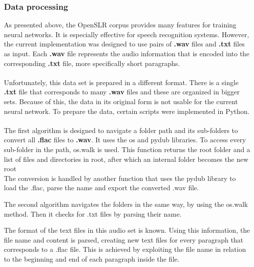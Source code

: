 \subsubsection{Data processing}
As presented above, the OpenSLR corpus provides many features for training neural networks. It is especially effective for speech recognition systems. However, the current implementation was designed to use pairs of \textbf{.wav} files and \textbf{.txt} files as input. Each \textbf{.wav} file represents the audio information that is encoded into the corresponding \textbf{.txt} file, more specifically short paragraphs.\\\\

Unfortunately, this data set is prepared in a different format. There is a single \textbf{.txt} file that corresponds to many \textbf{.wav} files and these are organized in bigger sets. Because of this, the data in its original form is not usable for the current neural network. To prepare the data, certain scripts were implemented in Python.\\\\
The first algorithm is designed to navigate a folder path and its sub-folders to convert all \textbf{.flac} files to \textbf{.wav}. It uses the os and pydub libraries.
To access every sub-folder in the path, os.walk is used. This function returns the root folder and a list of files and directories in root, after which an internal folder becomes the new root\\


The conversion is handled by another function that uses the pydub library to load the .flac, parse the name and export the converted .wav file.



The second algorithm navigates the folders in the same way, by using the os.walk method. Then it checks for .txt files by parsing their name. 



The format of the text files in this audio set is known. Using this information, the file name and content is parsed, creating new text files for every paragraph that corresponds to a .flac file. This is achieved by exploiting the file name in relation to the beginning and end of each paragraph inside the file.
 
